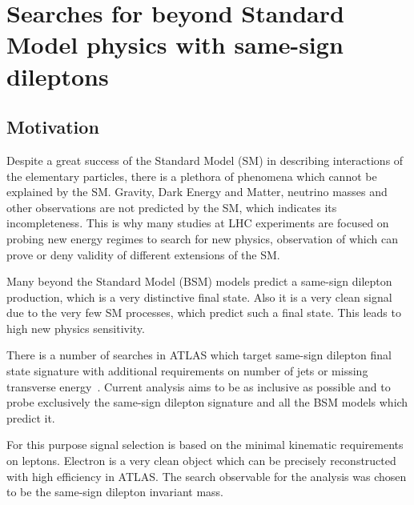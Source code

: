 \chapter{Searches for beyond Standard Model physics with same-sign dileptons}
\label{chap:SS}
\section{Motivation}

Despite a great success of the Standard Model (SM) in describing interactions of the elementary particles, there is a plethora of phenomena
which cannot be explained by the SM. Gravity, Dark Energy and Matter, neutrino masses and other observations are not predicted by the
SM, which indicates its incompleteness.
This is why many studies at LHC experiments are focused on probing new energy regimes to search for new physics, 
observation of which can prove or deny validity of different extensions of the SM.

Many beyond the Standard Model (BSM) models predict a same-sign dilepton production, which is a very distinctive final state.
Also it is a very clean signal due to the very few SM processes, which predict such a final state.
This leads to high new physics sensitivity.


There is a number of searches in ATLAS which target same-sign dilepton final state signature with 
additional requirements on number of jets or missing transverse energy~\cite{heavy_majorana_neutrino_paper,floderus_paper,Aad:2014pda}.
Current analysis aims to be as inclusive as possible and to probe exclusively the same-sign dilepton signature and
all the BSM models which predict it.

For this purpose signal selection is based on the minimal kinematic requirements on leptons.
Electron is a very clean object which can be precisely reconstructed with high efficiency in ATLAS.
The search observable for the analysis was chosen to be the same-sign dilepton invariant mass.

